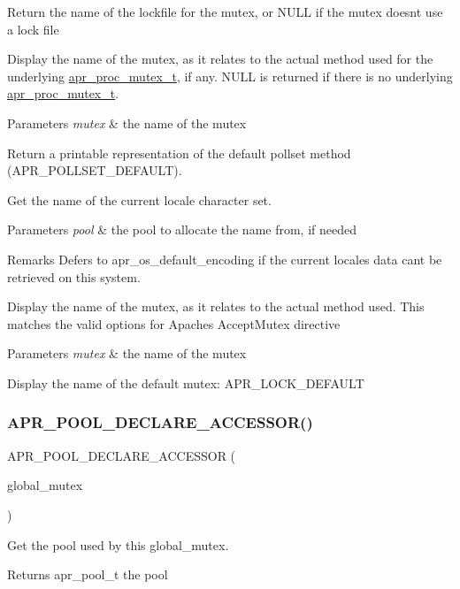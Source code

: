 Return the name of the lockfile for the mutex, or N\+U\+LL if the mutex doesn\textquotesingle{}t use a lock file

Display the name of the mutex, as it relates to the actual method used for the underlying \mbox{\hyperlink{structapr__proc__mutex__t}{apr\+\_\+proc\+\_\+mutex\+\_\+t}}, if any. N\+U\+LL is returned if there is no underlying \mbox{\hyperlink{structapr__proc__mutex__t}{apr\+\_\+proc\+\_\+mutex\+\_\+t}}. 
\begin{DoxyParams}{Parameters}
{\em mutex} & the name of the mutex\\
\hline
\end{DoxyParams}
Return a printable representation of the default pollset method (A\+P\+R\+\_\+\+P\+O\+L\+L\+S\+E\+T\+\_\+\+D\+E\+F\+A\+U\+LT).

Get the name of the current locale character set. 
\begin{DoxyParams}{Parameters}
{\em pool} & the pool to allocate the name from, if needed \\
\hline
\end{DoxyParams}
\begin{DoxyRemark}{Remarks}
Defers to apr\+\_\+os\+\_\+default\+\_\+encoding if the current locale\textquotesingle{}s data can\textquotesingle{}t be retrieved on this system.
\end{DoxyRemark}
Display the name of the mutex, as it relates to the actual method used. This matches the valid options for Apache\textquotesingle{}s Accept\+Mutex directive 
\begin{DoxyParams}{Parameters}
{\em mutex} & the name of the mutex\\
\hline
\end{DoxyParams}
Display the name of the default mutex\+: A\+P\+R\+\_\+\+L\+O\+C\+K\+\_\+\+D\+E\+F\+A\+U\+LT \mbox{\label{group___a_p_r___global_mutex_ga722d0f9777257de10d37d174468bc881}} 
\subsubsection{\texorpdfstring{A\+P\+R\+\_\+\+P\+O\+O\+L\+\_\+\+D\+E\+C\+L\+A\+R\+E\+\_\+\+A\+C\+C\+E\+S\+S\+O\+R()}{APR\_POOL\_DECLARE\_ACCESSOR()}}
{\footnotesize\ttfamily A\+P\+R\+\_\+\+P\+O\+O\+L\+\_\+\+D\+E\+C\+L\+A\+R\+E\+\_\+\+A\+C\+C\+E\+S\+S\+OR (\begin{DoxyParamCaption}\item[{global\+\_\+mutex}]{ }\end{DoxyParamCaption})}

Get the pool used by this global\+\_\+mutex. \begin{DoxyReturn}{Returns}
apr\+\_\+pool\+\_\+t the pool 
\end{DoxyReturn}

